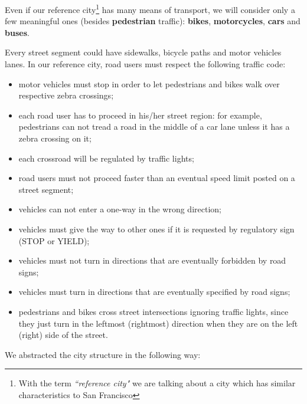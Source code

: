 Even if our reference city\footnote{With the term \emph{``reference city"}
we are talking about a city which has similar characteristics to San
Francisco} has many means of transport, we will consider only a few meaningful
ones (besides \textbf{pedestrian} traffic): \textbf{bikes},
\textbf{motorcycles}, \textbf{cars} and \textbf{buses}.

Every street segment could have sidewalks, bicycle paths and motor vehicles
lanes. In our reference city, road users must respect the following traffic
code:

\begin{itemize}
\item motor vehicles must stop in order to let pedestrians and bikes walk over
  respective zebra crossings;
\item each road user has to proceed in his/her street region: for example,
  pedestrians can not tread a road in the middle of a car lane unless it has a
  zebra crossing on it;
\item each crossroad will be regulated by traffic lights;
\item road users must not proceed faster than an eventual speed limit posted
  on a street segment;
\item vehicles can not enter a one-way in the wrong direction;
\item vehicles must give the way to other ones if it is requested by
  regulatory sign (STOP or YIELD);
\item vehicles must not turn in directions that are eventually forbidden by
  road signs;
\item vehicles must turn in directions that are eventually specified by road
  signs;
\item pedestrians and bikes cross street intersections ignoring traffic lights,
  since they just turn in the leftmost (rightmost) direction when they are on
  the left (right) side of the street.
\end{itemize}

We abstracted the city structure in the following way:


